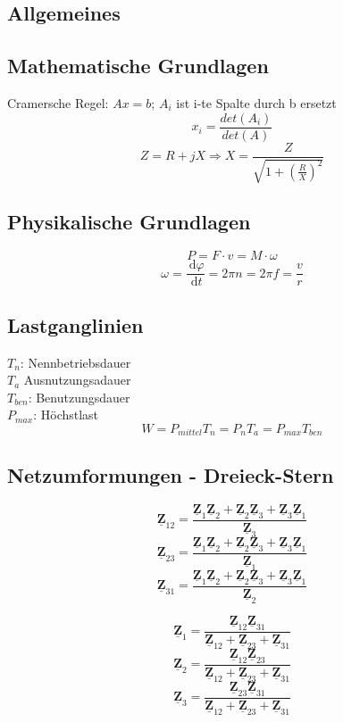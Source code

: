 \documentclass[9pt,a4paper]{scrartcl}
\renewcommand{\vec}[1]{\ensuremath{\underline{\boldsymbol {#1}}}}
\newcommand{\diff}{\ensuremath{\ \mathrm d}}									%
\begin{document}
\begin{multicols}{3}


	\section{Allgemeines}
		\subsection{Mathematische Grundlagen}
		Cramersche Regel: $A x = b$; $A_i$ ist i-te Spalte durch b ersetzt
		\[x_i = \frac{det(A_i)}{det(A)}\]	
		\[Z = R + j X \Rightarrow X = \frac{Z}{\sqrt{1 + \left( \frac{R}{X}\right)^2}}\]

		\subsection{Physikalische Grundlagen}
		\[P = F \cdot v = M \cdot \omega\]
		\[\omega = \frac{\diff \varphi}{\diff t} = 2 \pi n = 2 \pi f = \frac{v}{r}\]

		\subsection{Lastganglinien}
		$T_n$: Nennbetriebsdauer\\
		$T_a$ Ausnutzungsadauer\\
		$T_{ben}$: Benutzungsdauer\\
		$P_{max}$: Höchstlast\\
		\[W = P_{mittel} T_n = P_n T_a = P_{max} T_{ben}\]
		
		\subsection{Netzumformungen - Dreieck-Stern}
		\[\vec Z_{12} = \frac{\vec Z_1 \vec Z_2 + \vec Z_2 \vec Z_3 + \vec Z_3 \vec Z_1}{\vec Z_3}\]
		\[\vec Z_{23} = \frac{\vec Z_1 \vec Z_2 + \vec Z_2 \vec Z_3 + \vec Z_3 \vec Z_1}{\vec Z_1}\]
		\[\vec Z_{31} = \frac{\vec Z_1 \vec Z_2 + \vec Z_2 \vec Z_3 + \vec Z_3 \vec Z_1}{\vec Z_2}\]
		
		\[\vec Z_1 = \frac{\vec Z_{12} \vec Z_{31}}{\vec Z_{12} + \vec Z_{23} + \vec Z_{31}}\]
		\[\vec Z_2 = \frac{\vec Z_{12} \vec Z_{23}}{\vec Z_{12} + \vec Z_{23} + \vec Z_{31}}\]
		\[\vec Z_3 = \frac{\vec Z_{23} \vec Z_{31}}{\vec Z_{12} + \vec Z_{23} + \vec Z_{31}}\]
	

\end{multicols}
\end{document}
